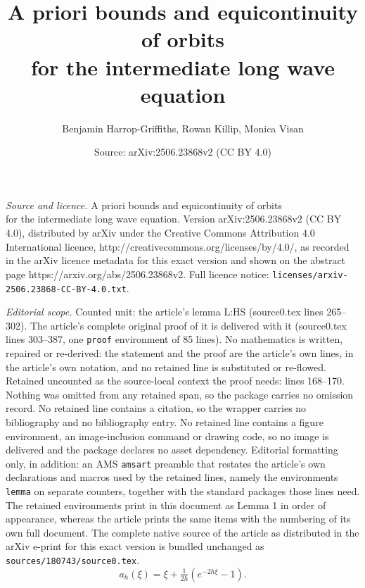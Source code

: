 \documentclass[10pt,a4paper]{amsart}
\title{A priori bounds and equicontinuity of orbits\\for the intermediate long wave equation}
\author{Benjamin Harrop-Griffiths, Rowan Killip, Monica Visan}
\date{Source: arXiv:2506.23868v2 (CC BY 4.0)}
\begin{document}
\maketitle

\noindent\emph{Source and licence.} A priori bounds and equicontinuity of orbits\\for the intermediate long wave equation. Version arXiv:2506.23868v2 (CC BY 4.0), distributed by arXiv under the Creative Commons Attribution 4.0 International licence, http://creativecommons.org/licenses/by/4.0/, as recorded in the arXiv licence metadata for this exact version and shown on the abstract page https://arxiv.org/abs/2506.23868v2. Full licence notice: \texttt{licenses/arxiv-2506.23868-CC-BY-4.0.txt}.\par\smallskip

\noindent\textit{Editorial scope.} Counted unit: the article's lemma L:HS (source0.tex lines 265--302). The article's complete original proof of it is delivered with it (source0.tex lines 303--387, one \texttt{proof} environment of 85 lines). No mathematics is written, repaired or re-derived: the statement and the proof are the article's own lines, in the article's own notation, and no retained line is substituted or re-flowed.  Retained uncounted as the source-local context the proof needs: lines 168--170.  Nothing was omitted from any retained span, so the package carries no omission record.  No retained line contains a citation, so the wrapper carries no bibliography and no bibliography entry.  No retained line contains a figure environment, an image-inclusion command or drawing code, so no image is delivered and the package declares no asset dependency.  Editorial formatting only, in addition: an AMS \texttt{amsart} preamble that restates the article's own declarations and macros used by the retained lines, namely the environments \texttt{lemma} on separate counters, together with the standard packages those lines need.  The retained environments print in this document as Lemma 1 in order of appearance, whereas the article prints the same items with the numbering of its own full document.  The complete native source of the article as distributed in the arXiv e-print for this exact version is bundled unchanged as \texttt{sources/180743/source0.tex}.
\begin{equation}\label{symbol}
a_h(\xi) = \xi+ \tfrac1{2h}(e^{-2h\xi}-1).
\end{equation}
\end{document}

